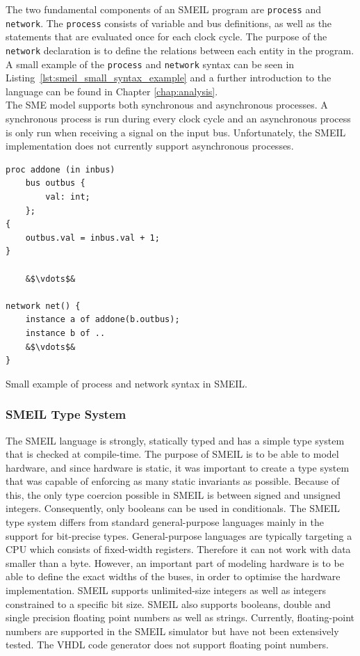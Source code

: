 The two fundamental components of an SMEIL program are \texttt{process} and \texttt{network}. The \texttt{process} consists of variable and bus definitions, as well as the statements that are evaluated once for each clock cycle. The purpose of the \texttt{network} declaration is to define the relations between each entity in the program. A small example of the \texttt{process} and \texttt{network} syntax can be seen in Listing~\ref{lst:smeil_small_syntax_example} and a further introduction to the language can be found in Chapter \ref{chap:analysis}.\\

The SME model supports both synchronous and asynchronous processes. A synchronous process is run during every clock cycle and an asynchronous process is only run when receiving a signal on the input bus. Unfortunately, the SMEIL implementation does not currently support asynchronous processes.
\begin{listing}
\begin{verbatim}
proc addone (in inbus)
    bus outbus {
        val: int;
    };
{
    outbus.val = inbus.val + 1;
}

    &$\vdots$&

network net() {
    instance a of addone(b.outbus);
    instance b of ..
    &$\vdots$&
}
\end{verbatim}
\caption{Small example of process and network syntax in SMEIL.}
\label{lst:smeil_small_syntax_example}
\end{listing}
\subsubsection{SMEIL Type System}
The SMEIL language is strongly, statically typed and has a simple type system that is checked at compile-time. The purpose of SMEIL is to be able to model hardware, and since hardware is static, it was important to create a type system that was capable of enforcing as many static invariants as possible.
Because of this, the only type coercion possible in SMEIL is between signed and unsigned integers. Consequently, only booleans can be used in conditionals.
The SMEIL type system differs from standard general-purpose languages mainly in the support for bit-precise types. General-purpose languages are typically targeting a CPU which consists of fixed-width registers. Therefore it can not work with data smaller than a byte. However, an important part of modeling hardware is to be able to define the exact widths of the buses, in order to optimise the hardware implementation. SMEIL supports unlimited-size integers as well as integers constrained to a specific bit size. SMEIL also supports booleans, double and single precision floating point numbers as well as strings. Currently, floating-point numbers are supported in the SMEIL simulator but have not been extensively tested. The VHDL code generator does not support floating point numbers. \\

